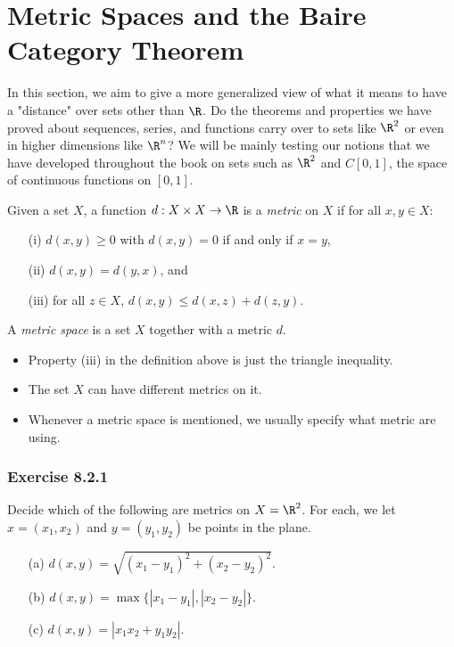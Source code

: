 \section{Metric Spaces and the Baire Category Theorem}

In this section, we aim to give a more generalized view of what it means to have a "distance" over sets other than \( \R  \). Do the theorems and properties we have proved about sequences, series, and functions carry over to sets like \( \R^{2} \) or even in higher dimensions like \( \R^n \)? We will be mainly testing our notions that we have developed throughout the book on sets such as \( \R^{2} \) and \( C[0,1] \), the space of continuous functions on \( [0,1] \).


\begin{tcolorbox}
\begin{defn}
Given a set \( X  \), a function \( d: X \times X \to \R  \) is a \textit{metric} on \( X  \) if for all \( x,y \in X  \):
\begin{enumerate}
    \item[(i)]\( d(x,y) \geq 0  \) with \( d(x,y) =0  \) if and only if \( x = y  \),
    \item[(ii)] \( d(x,y) = d(y,x)  \), and 
    \item[(iii)] for all \( z \in X \), \( d(x,y) \leq d(x,z) + d(z,y) \).
\end{enumerate}
A \textit{metric space} is a set \( X  \) together with a metric \( d  \).
\end{defn}
\end{tcolorbox}

\begin{itemize}
    \item Property (iii) in the definition above is just the triangle inequality.
    \item The set \( X  \) can have different metrics on it.
    \item Whenever a metric space is mentioned, we usually specify what metric are using.
\end{itemize}

\subsubsection{Exercise 8.2.1} Decide which of the following are metrics on \( X = \R^2  \). For each, we let \( x = (x_{1}, x_{2}) \) and \( y = (y_{1}, y_{2}) \) be points in the plane.
\begin{enumerate}
    \item[(a)] \( d(x,y) = \sqrt{ (x_{1}- y_{1})^2 + (x_{2} - y_{2})^{2} }. \)
    \item[(b)] \( d(x,y) = \max \{ | x_{1} - y_{1} |, | x_{2} - y_{2} |  \}. \)
    \item[(c)] \( d(x,y) = | x_{1} x_{2} + y_{1} y_{2} |  \).
\end{enumerate}

